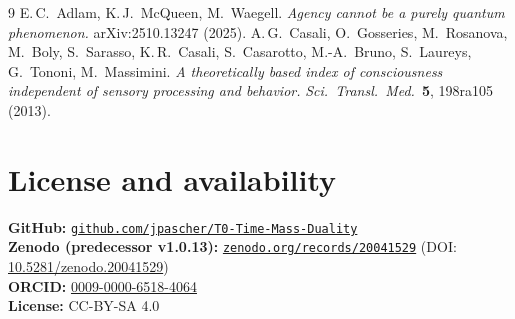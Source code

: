 \begin{thebibliography}{9}
 E.\,C.~Adlam, K.\,J.~McQueen, M.~Waegell. \emph{Agency cannot be a purely quantum phenomenon.} arXiv:2510.13247 (2025).
 A.\,G.~Casali, O.~Gosseries, M.~Rosanova, M.~Boly, S.~Sarasso, K.\,R.~Casali, S.~Casarotto, M.-A.~Bruno, S.~Laureys, G.~Tononi, M.~Massimini. \emph{A theoretically based index of consciousness independent of sensory processing and behavior.} \emph{Sci.\ Transl.\ Med.}\ \textbf{5}, 198ra105 (2013).
\end{thebibliography}

\section*{License and availability}

\textbf{GitHub:} \href{https://github.com/jpascher/T0-Time-Mass-Duality}{\texttt{github.com/jpascher/T0-Time-Mass-Duality}}\\
\textbf{Zenodo (predecessor v1.0.13):} \href{https://zenodo.org/records/20041529}{\texttt{zenodo.org/records/20041529}} (DOI: \href{https://doi.org/10.5281/zenodo.20041529}{10.5281/zenodo.20041529})\\
\textbf{ORCID:} \href{https://orcid.org/0009-0000-6518-4064}{0009-0000-6518-4064}\\
\textbf{License:} CC-BY-SA 4.0
